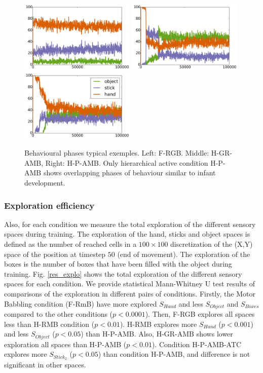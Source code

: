 \documentclass[10pt,letterpaper]{article}
\begin{document}
		\begin{figure}[ht]
			\centering
			\includegraphics[width=5.5cm]{./include/F-RGB-log53-events-100000.pdf}
			\hspace{-0.4cm}
			\includegraphics[width=5.5cm]{./include/H-RGB-GR-AMB-log13-events-100000.pdf}
			\hspace{-0.4cm}
			\includegraphics[width=5.5cm]{./include/H-RGB-P-AMB-log38-events-100000.pdf}
			\caption{Behavioural phases typical exemples. Left: F-RGB. Middle: H-GR-AMB, Right: H-P-AMB. Only hierarchical active condition H-P-AMB shows overlapping phases of behaviour similar to infant development.}
			\label{res_ow}
		\end{figure}
		
	
	
	\subsubsection{Exploration efficiency}

		Also, for each condition we measure the total exploration of the different sensory spaces during training. 
		The exploration of the hand, sticks and object spaces is defined as the number of reached cells 
		in a $100\times100$ discretization of the (X,Y) space of the position at timestep $50$ (end of movement).
		The exploration of the boxes is the number of boxes that have been filled with the object during training.
		Fig. \ref{res_explo} shows the total exploration of the different sensory spaces for each condition.
		We provide statistical Mann-Whitney U test results of comparisons of the exploration in different pairs of conditions.
		Firstly, the Motor Babbling condition (F-RmB) have more explored $S_{Hand}$ and less $S_{Object}$ and $S_{Boxes}$ compared to the other conditions ($p<0.0001$).
		Then, F-RGB explores all spaces less than H-RMB condition ($p<0.01$).
		H-RMB explores more $S_{Hand}$ ($p<0.001$) and less $S_{Object}$ ($p<0.05$) than H-P-AMB.
		Also, H-GR-AMB shows lower exploration all spaces than H-P-AMB ($p<0.01$).
		Condition H-P-AMB-ATC explores more $S_{Stick_2}$ ($p<0.05$) than condition H-P-AMB, and difference is not significant in other spaces.
		
\end{document}
